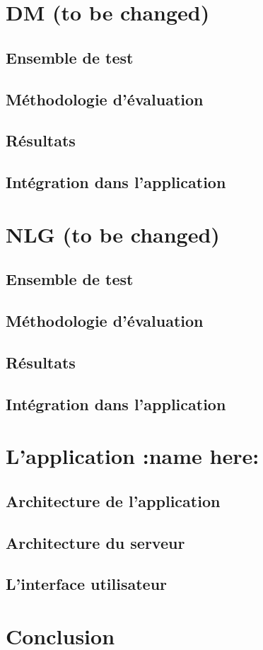 \section{DM (to be changed)}
\subsection{Ensemble de test}
\subsection{Méthodologie d'évaluation}
\subsection{Résultats}
\subsection{Intégration dans l'application}



\section{NLG (to be changed)}
\subsection{Ensemble de test}
\subsection{Méthodologie d'évaluation}
\subsection{Résultats}
\subsection{Intégration dans l'application}

\section{L'application :name here:}
\subsection{Architecture de l'application}
\subsection{Architecture du serveur}
\subsection{L'interface utilisateur}


\section{Conclusion}

